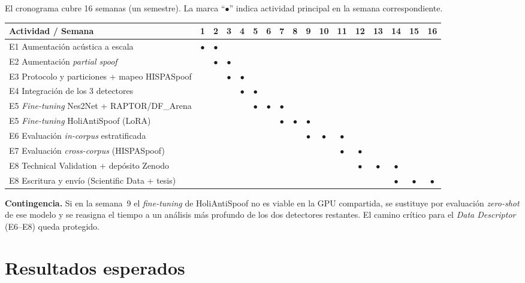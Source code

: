\documentclass[11pt]{article}
\begin{document}
El cronograma cubre 16 semanas (un semestre). La marca ``$\bullet$''
indica actividad principal en la semana correspondiente.

\begin{center}
\footnotesize
\setlength{\tabcolsep}{3pt}
\renewcommand{\arraystretch}{1.25}
\begin{longtable}{p{5.2cm}*{16}{c}}
\toprule
\textbf{Actividad / Semana} &
1&2&3&4&5&6&7&8&9&10&11&12&13&14&15&16 \\
\midrule
\endhead
E1 Aumentaci\'on ac\'ustica a escala
 &$\bullet$&$\bullet$& & & & & & & & & & & & & & \\
E2 Aumentaci\'on \emph{partial spoof}
 & &$\bullet$&$\bullet$& & & & & & & & & & & & & \\
E3 Protocolo y particiones + mapeo HISPASpoof
 & & &$\bullet$&$\bullet$& & & & & & & & & & & & \\
E4 Integraci\'on de los 3 detectores
 & & & &$\bullet$&$\bullet$& & & & & & & & & & & \\
E5 \emph{Fine-tuning} Nes2Net + RAPTOR/DF\_Arena
 & & & & &$\bullet$&$\bullet$&$\bullet$& & & & & & & & & \\
E5 \emph{Fine-tuning} HoliAntiSpoof (LoRA)
 & & & & & & &$\bullet$&$\bullet$&$\bullet$& & & & & & & \\
E6 Evaluaci\'on \emph{in-corpus} estratificada
 & & & & & & & & &$\bullet$&$\bullet$&$\bullet$& & & & & \\
E7 Evaluaci\'on \emph{cross-corpus} (HISPASpoof)
 & & & & & & & & & & &$\bullet$&$\bullet$& & & & \\
E8 Technical Validation + dep\'osito Zenodo
 & & & & & & & & & & & &$\bullet$&$\bullet$&$\bullet$& & \\
E8 Escritura y env\'io (Scientific Data + tesis)
 & & & & & & & & & & & & & &$\bullet$&$\bullet$&$\bullet$ \\
\bottomrule
\end{longtable}
\end{center}

\noindent\textbf{Contingencia.} Si en la semana~9 el \emph{fine-tuning} de
HoliAntiSpoof no es viable en la GPU compartida, se sustituye por
evaluaci\'on \emph{zero-shot} de ese modelo y se reasigna el tiempo a un
an\'alisis m\'as profundo de los dos detectores restantes. El camino
cr\'itico para el \emph{Data Descriptor} (E6--E8) queda protegido.

\section{Resultados esperados}
\end{document}
